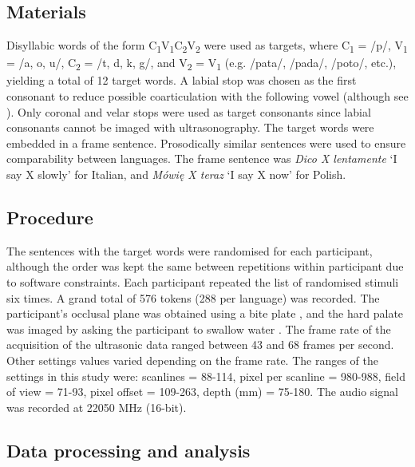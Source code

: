 \documentclass[authoryear, twocolumn]{elsarticle}
\begin{document}
\subsection{Materials}\label{materials}

Disyllabic words of the form
C\textsubscript{1}V\textsubscript{1}C\textsubscript{2}V\textsubscript{2}
were used as targets, where C\textsubscript{1} = /p/, V\textsubscript{1}
= /a, o, u/, C\textsubscript{2} = /t, d, k, g/, and V\textsubscript{2} =
V\textsubscript{1} (e.g. /pata/, /pada/, /poto/, etc.), yielding a total
of 12 target words. A labial stop was chosen as the first consonant to
reduce possible coarticulation with the following vowel (although see
\citealt{vazquez-alvarez2007}). Only coronal and velar stops were used
as target consonants since labial consonants cannot be imaged with
ultrasonography. The target words were embedded in a frame sentence.
Prosodically similar sentences were used to ensure comparability between
languages. The frame sentence was \emph{Dico X lentamente} `I say X
slowly' for Italian, and \emph{Mówię X teraz} `I say X now' for Polish.

\subsection{Procedure}\label{procedure}

The sentences with the target words were randomised for each
participant, although the order was kept the same between repetitions
within participant due to software constraints. Each participant
repeated the list of randomised stimuli six times. A grand total of 576
tokens (288 per language) was recorded. The participant's occlusal plane
was obtained using a bite plate \citep{scobbie2011}, and the hard palate
was imaged by asking the participant to swallow water
\citep{epstein2005}. The frame rate of the acquisition of the ultrasonic
data ranged between 43 and 68 frames per second. Other settings values
varied depending on the frame rate. The ranges of the settings in this
study were: scanlines = 88-114, pixel per scanline = 980-988, field of
view = 71-93, pixel offset = 109-263, depth (mm) = 75-180. The audio
signal was recorded at 22050 MHz (16-bit).

\subsection{Data processing and
analysis}\label{data-processing-and-analysis}
\end{document}
